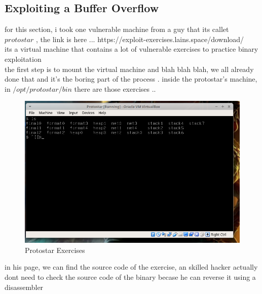 \documentclass[10pt,a4paper]{article} %
\begin{document}
        \subsection{Exploiting a Buffer Overflow}
            for this section, i took one vulnerable machine from a guy that its
            callet $ protostar  $  , the link is here ...
            https://exploit-exercises.lains.space/download/
            \\ its a virtual machine that contains a lot of vulnerable
            exercises to practice binary exploitation
            \\ the first step is to mount the virtual machine and blah blah
            blah, we all already done that and it's the boring part of the process .
            inside the protostar's machine, in $ /opt/protostar/bin  $ there are those exercises ..
            \\
            \begin{figure}[h!]
                \centering
                \includegraphics[width=0.5\linewidth]{proto.png}
                \caption{Protostar Exercises}
                \label{fig:proto}
            \end{figure}
            in his page, we can find the source code of the exercise, an
            skilled hacker actually dont need to check the source code of the
            binary becase he can reverse it using a disassembler
            \\
\end{document}

